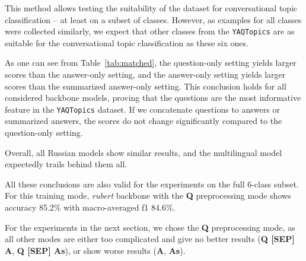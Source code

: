 This method allows testing the suitability of the dataset for conversational topic classification -- at least on a subset of classes. However, as examples for all classes were collected similarly, we expect that other classes from the \texttt{YAQTopics} are as suitable for the conversational topic classification as these six ones. 

As one can see from Table~\ref{tab:matched}, the question-only setting yields larger scores than the answer-only setting, and the answer-only setting yields larger scores than the summarized answer-only setting. This conclusion holds for all considered backbone models, proving that the questions are the most informative feature in the \texttt{YAQTopics} dataset.
If we concatenate questions to answers or summarized answers, the scores do not change significantly compared to the question-only setting.

Overall, all Russian models show similar results, and the multilingual model expectedly trails behind them all.

All these conclusions are also valid for the experiments on the full 6-class subset. For this training mode, 
 \textit{rubert} backbone with the \textbf{Q} preprocessing mode shows accuracy 85.2\% with macro-averaged f1 84.6\%.

For the experiments in the next section, we chose the \textbf{Q} preprocessing mode, as all other modes are either too complicated and give no better results (\textbf{Q [SEP] A}, \textbf{Q [SEP] As}), or show worse results (\textbf{A}, \textbf{As}).





